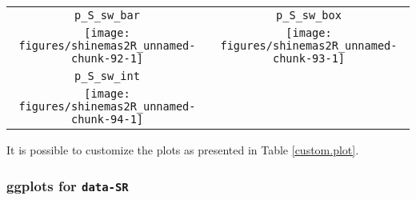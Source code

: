 \documentclass{article}\usepackage[]{graphicx}\usepackage[]{color}
\newenvironment{knitrout}{}{} %
\begin{document}
\begin{center}
\begin{tabular}{cc}
\texttt{p\_S\_sw\_bar} & \texttt{p\_S\_sw\_box} \\
\begin{knitrout}
\definecolor{shadecolor}{rgb}{0.969, 0.969, 0.969}\color{fgcolor}

{\centering \texttt{[image: figures/shinemas2R\_unnamed-chunk-92-1]} 

}



\end{knitrout}
&
\begin{knitrout}
\definecolor{shadecolor}{rgb}{0.969, 0.969, 0.969}\color{fgcolor}

{\centering \texttt{[image: figures/shinemas2R\_unnamed-chunk-93-1]} 

}



\end{knitrout}
\\
\texttt{p\_S\_sw\_int} & \\
\begin{knitrout}
\definecolor{shadecolor}{rgb}{0.969, 0.969, 0.969}\color{fgcolor}

{\centering \texttt{[image: figures/shinemas2R\_unnamed-chunk-94-1]} 

}



\end{knitrout}
&
\\
\end{tabular}
\end{center}

It is possible to customize the plots as presented in Table \ref{custom.plot}.

\subsubsection{ggplots for \texttt{data-SR} }
\end{document}
